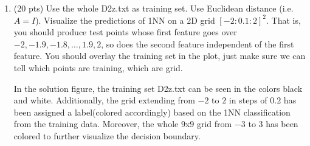 \documentclass[a4paper]{article}
\theoremstyle{definition}
\def\x{\mathbf x}
\newenvironment{soln}{
    \leavevmode\color{blue}\ignorespaces
}{}
\begin{document}
\begin{enumerate}
\begin{soln}
	(i) We note that for an orthogonal matrix $Q$, the following holds:  $QQ^\top = Q^\top Q = I$. Thus,
	$$
	d_I(\tilde \x, \tilde \x') = \sqrt{(\tilde \x - \tilde \x')^\top I (\tilde \x- \tilde \x')} = \sqrt{(UL \x - UL \x')^\top I (UL \x- UL\x')} 
	$$
	$$
	= \sqrt{(\x - \x')^\top L^\top U^\top I UL (\x- \x')}
	$$
	Now, $ L^\top U^\top I UL = L^\top I L = A $, as $U^\top IU = I$ and $L^\top I L = A$
	Thus, 
	$$
	d_I(\tilde \x, \tilde \x') = \sqrt{(\x - \x')^\top L^\top U^\top I UL (\x- \x')} = \sqrt{(\x - \x')^\top A (\x- \x')} = d_A(\x, \x') 
	$$
	
	(ii) As discussed before, $Lx$ leads to a Hadamard like product between the square-rooted diagonal elements $\{\sqrt{a_{11}}, ... , \sqrt{a_{dd}} \}$ and $\x \in \mathbb{R}^{d}$. Proceeding on with this, $ULx$ leads to a linear transformation of $Lx$ that preserves the dot product of $Lx$ and other isometries, i.e. preserves the vector's lengths. 
\end{soln}

\newpage
\item (20 pts) Use the whole D2z.txt as training set.  Use Euclidean distance (i.e. $A=I$).
Visualize the predictions of 1NN on a 2D grid $[-2:0.1:2]^2$.
That is, you should produce test points whose first feature goes over $-2, -1.9, -1.8, \ldots, 1.9, 2$, so does the second feature independent of the first feature.
You should overlay the training set in the plot, just make sure we can tell which points are training, which are grid.

\begin{soln}


In the solution figure, the training set D2z.txt can be seen in the colors black and white. Additionally, the grid extending from $-2$ to $2$ in steps of $0.2$ has been assigned a label(colored accordingly) based on the 1NN classification from the training data. Moreover, the whole $9$x$9$ grid from $-3$ to $3$ has been colored to further visualize the decision boundary.

\end{soln}


\end{enumerate}
\end{document}
